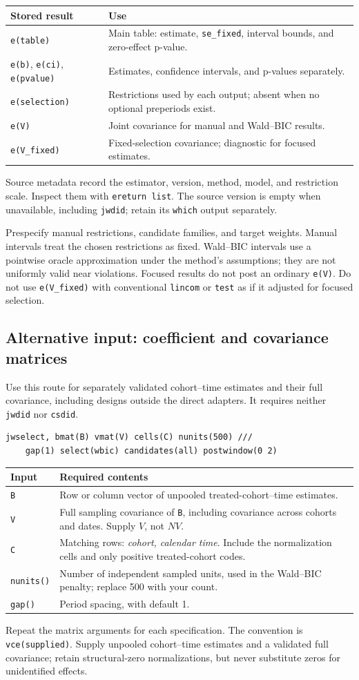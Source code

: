 \documentclass[11pt]{article}
\newcommand{\cmd}[1]{\texttt{#1}}
\begin{document}
\begin{tabularx}{\linewidth}{@{}p{.38\linewidth}Y@{}}
\toprule
Stored result & Use \\
\midrule
\cmd{e(table)} & Main table: estimate, \cmd{se\_fixed}, interval bounds, and zero-effect p-value. \\
\cmd{e(b)}, \cmd{e(ci)}, \cmd{e(pvalue)} & Estimates, confidence intervals, and p-values separately. \\
\cmd{e(selection)} & Restrictions used by each output; absent when no optional preperiods exist. \\
\cmd{e(V)} & Joint covariance for manual and Wald--BIC results. \\
\cmd{e(V\_fixed)} & Fixed-selection covariance; diagnostic for focused estimates. \\
\bottomrule
\end{tabularx}

Source metadata record the estimator, version, method, model, and restriction
scale. Inspect them with \cmd{ereturn list}. The source version is empty when
unavailable, including \cmd{jwdid}; retain its \cmd{which} output separately.

Prespecify manual restrictions, candidate families, and target weights.
Manual intervals treat the chosen restrictions as fixed. Wald--BIC intervals
use a pointwise oracle approximation under the method's assumptions; they
are not uniformly valid near violations. Focused results do not post an
ordinary \cmd{e(V)}. Do not use \cmd{e(V\_fixed)} with conventional
\cmd{lincom} or \cmd{test} as if it adjusted for focused selection.

\subsection*{Alternative input: coefficient and covariance matrices}
\label{sec:matrix}
Use this route for separately validated cohort--time estimates and their full
covariance, including designs outside the direct adapters. It requires neither
\cmd{jwdid} nor \cmd{csdid}.
\begin{lstlisting}
jwselect, bmat(B) vmat(V) cells(C) nunits(500) ///
    gap(1) select(wbic) candidates(all) postwindow(0 2)
\end{lstlisting}
\begin{tabularx}{\linewidth}{@{}p{.23\linewidth}Y@{}}
\toprule
Input & Required contents \\
\midrule
\cmd{B} & Row or column vector of unpooled treated-cohort--time estimates. \\
\cmd{V} & Full sampling covariance of \cmd{B}, including covariance across cohorts and dates. Supply $V$, not $NV$. \\
\cmd{C} & Matching rows: \emph{cohort, calendar time}. Include the normalization cells and only positive treated-cohort codes. \\
\cmd{nunits()} & Number of independent sampled units, used in the Wald--BIC penalty; replace 500 with your count. \\
\cmd{gap()} & Period spacing, with default 1. \\
\bottomrule
\end{tabularx}

\enlargethispage{\baselineskip}
Repeat the matrix arguments for each specification. The convention is
\cmd{vce(supplied)}. Supply unpooled cohort--time estimates and a validated full
covariance; retain structural-zero normalizations, but never substitute zeros
for unidentified effects.
\end{document}
